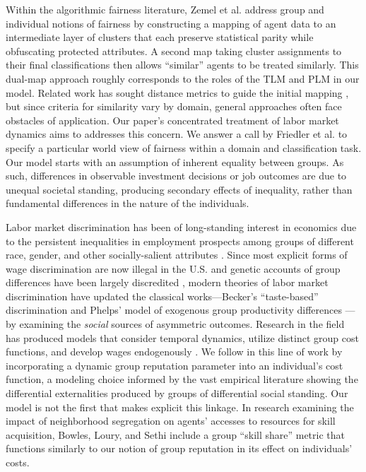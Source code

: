\documentclass[sigconf]{acmart}
\theoremstyle{definition}
\begin{document}
Within the algorithmic fairness literature, Zemel et al. \cite{zemel2013learning} address group and individual notions of fairness by constructing a mapping of agent data to an intermediate layer of clusters that each preserve statistical parity while obfuscating protected attributes. A second map taking cluster assignments to their final classifications then allows ``similar'' agents to be treated similarly. This dual-map approach roughly corresponds to the roles of the TLM and PLM in our model. Related work has sought distance metrics to guide the initial mapping \cite{dwork2012fairness}, but since criteria for similarity vary by domain, general approaches often face obstacles of application. Our paper's concentrated treatment of labor market dynamics aims to addresses this concern. We answer a call by Friedler et al. \cite{friedler2016possibility} to specify a particular world view of fairness within a domain and classification task. Our model starts with an assumption of inherent equality between groups. As such, differences in observable investment decisions or job outcomes are due to unequal societal standing, producing secondary effects of inequality, rather than fundamental differences in the nature of the individuals.


Labor market discrimination has been of long-standing interest in economics due to the persistent inequalities in employment prospects among groups of different race, gender, and other socially-salient attributes \cite{cain1986economic, altonji1999race, fryer2013racial}. Since most explicit forms of wage discrimination are now illegal in the U.S. and genetic accounts of group differences have been largely discredited \cite{neal1996role}, modern theories of labor market discrimination have updated the classical works---Becker's ``taste-based'' discrimination \cite{becker1971economics} and Phelps' model of exogenous group productivity differences \cite{phelps1972statistical}---by examining the \emph{social} sources of asymmetric outcomes. Research in the field has produced models that consider temporal dynamics, utilize distinct group cost functions, and develop wages endogenously \cite{chaudhuri2008statistical, antonovics2006statistical}. We follow in this line of work by incorporating a dynamic group reputation parameter into an individual's cost function, a modeling choice informed by the vast empirical literature showing the differential externalities produced by groups of differential social standing. Our model is not the first that makes explicit this linkage. In research examining the impact of neighborhood segregation on agents' accesses to resources for skill acquisition, Bowles, Loury, and Sethi \cite{bowles2014group} include a group ``skill share'' metric that functions similarly to our notion of group reputation in its effect on individuals' costs.
\end{document}
